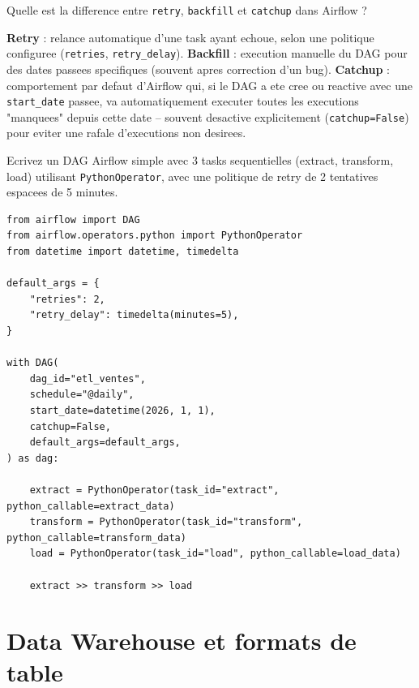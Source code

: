 \documentclass[11pt,a4paper]{article}
\begin{document}
\begin{question} Quelle est la difference entre \texttt{retry}, \texttt{backfill} et \texttt{catchup} dans Airflow ?
\end{question}
\begin{reponse}
\textbf{Retry} : relance automatique d'une task ayant echoue, selon une politique configuree (\texttt{retries}, \texttt{retry\_delay}). \textbf{Backfill} : execution manuelle du DAG pour des dates passees specifiques (souvent apres correction d'un bug). \textbf{Catchup} : comportement par defaut d'Airflow qui, si le DAG a ete cree ou reactive avec une \texttt{start\_date} passee, va automatiquement executer toutes les executions "manquees" depuis cette date -- souvent desactive explicitement (\texttt{catchup=False}) pour eviter une rafale d'executions non desirees.
\end{reponse}

\begin{coding}
Ecrivez un DAG Airflow simple avec 3 tasks sequentielles (extract, transform, load) utilisant \texttt{PythonOperator}, avec une politique de retry de 2 tentatives espacees de 5 minutes.
\end{coding}

\begin{lstlisting}
from airflow import DAG
from airflow.operators.python import PythonOperator
from datetime import datetime, timedelta

default_args = {
    "retries": 2,
    "retry_delay": timedelta(minutes=5),
}

with DAG(
    dag_id="etl_ventes",
    schedule="@daily",
    start_date=datetime(2026, 1, 1),
    catchup=False,
    default_args=default_args,
) as dag:

    extract = PythonOperator(task_id="extract", python_callable=extract_data)
    transform = PythonOperator(task_id="transform", python_callable=transform_data)
    load = PythonOperator(task_id="load", python_callable=load_data)

    extract >> transform >> load
\end{lstlisting}

\newpage
\section{Data Warehouse et formats de table}
\end{document}
